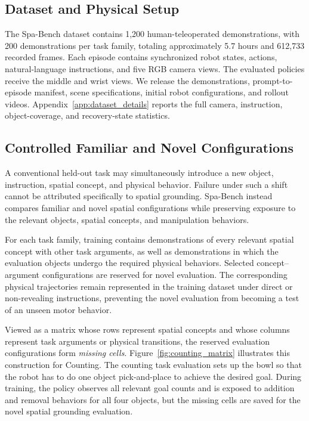 \documentclass[conference]{IEEEtran}
\begin{document}
\subsection{Dataset and Physical Setup}

The Spa-Bench dataset contains 1,200 human-teleoperated demonstrations, with 200 demonstrations per task family, totaling approximately 5.7 hours and 612,733 recorded frames. Each episode contains synchronized robot states, actions, natural-language instructions, and five RGB camera views. The evaluated policies receive the middle and wrist views. We release the demonstrations, prompt-to-episode manifest, scene specifications, initial robot configurations, and rollout videos. Appendix~\ref{app:dataset_details} reports the full camera, instruction, object-coverage, and recovery-state statistics.


\subsection{Controlled Familiar and Novel Configurations}

A conventional held-out task may simultaneously introduce a new object, instruction, spatial concept, and physical behavior. Failure under such a shift cannot be attributed specifically to spatial grounding. Spa-Bench instead compares familiar and novel spatial configurations while preserving exposure to the relevant objects, spatial concepts, and manipulation behaviors.

For each task family, training contains demonstrations of every relevant spatial concept with other task arguments, as well as demonstrations in which the evaluation objects undergo the required physical behaviors. Selected concept--argument configurations are reserved for novel evaluation. The corresponding physical trajectories remain represented in the training dataset under direct or non-revealing instructions, preventing the novel evaluation from becoming a test of an unseen motor behavior.

Viewed as a matrix whose rows represent spatial concepts and whose columns represent task arguments or physical transitions, the reserved evaluation configurations form \emph{missing cells}. Figure~\ref{fig:counting_matrix} illustrates this construction for Counting. The counting task evaluation sets up the bowl so that the robot has to do one object pick-and-place to achieve the desired goal. During training, the policy observes all relevant goal counts and is exposed to addition and removal behaviors for all four objects, but the missing cells are saved for the novel spatial grounding evaluation.
\end{document}
